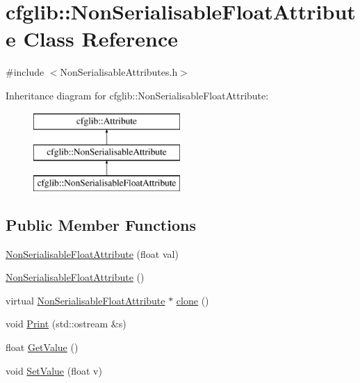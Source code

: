 \hypertarget{classcfglib_1_1NonSerialisableFloatAttribute}{}\section{cfglib\+:\+:Non\+Serialisable\+Float\+Attribute Class Reference}
\label{classcfglib_1_1NonSerialisableFloatAttribute}


{\ttfamily \#include $<$Non\+Serialisable\+Attributes.\+h$>$}

Inheritance diagram for cfglib\+:\+:Non\+Serialisable\+Float\+Attribute\+:\begin{figure}[H]
\begin{center}
\leavevmode
\includegraphics[height=3.000000cm]{classcfglib_1_1NonSerialisableFloatAttribute}
\end{center}
\end{figure}
\subsection*{Public Member Functions}
\begin{DoxyCompactItemize}
\item 
\hyperlink{classcfglib_1_1NonSerialisableFloatAttribute_a9f997d517dd321ec532c21c60a820d52}{Non\+Serialisable\+Float\+Attribute} (float val)
\item 
\hyperlink{classcfglib_1_1NonSerialisableFloatAttribute_a9dc9a9a6554ae4cb56337caba4db7ff8}{Non\+Serialisable\+Float\+Attribute} ()
\item 
virtual \hyperlink{classcfglib_1_1NonSerialisableFloatAttribute}{Non\+Serialisable\+Float\+Attribute} $\ast$ \hyperlink{classcfglib_1_1NonSerialisableFloatAttribute_a8cf8fa70d97d003cf48c64c59609eeaf}{clone} ()
\item 
void \hyperlink{classcfglib_1_1NonSerialisableFloatAttribute_a507fc8e93b9ff7c56d483f2e51634e67}{Print} (std\+::ostream \&s)
\item 
float \hyperlink{classcfglib_1_1NonSerialisableFloatAttribute_a4d2bc3d3ab44c4f8e05c6c0c6f3dfc4a}{Get\+Value} ()
\item 
void \hyperlink{classcfglib_1_1NonSerialisableFloatAttribute_a68b000967be65bfa02626352476ca64e}{Set\+Value} (float v)
\end{DoxyCompactItemize}
